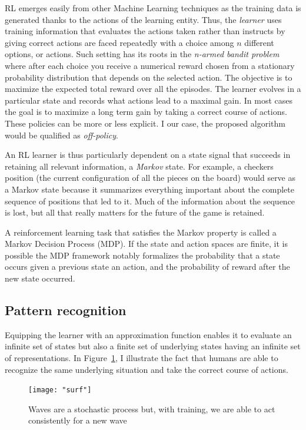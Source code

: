 \documentclass[letterpaper, 10.5 pt, conference]{ieeeconf}
\begin{document}
RL emerges easily from other Machine Learning techniques as the training data is generated thanks to the actions of the learning entity. Thus, the \textit{learner} uses training information that evaluates the actions taken rather than instructs by giving correct actions are faced repeatedly with a choice among $n$ different options, or actions. Such setting has its roots in the \textit{n-armed bandit problem} where after each choice you receive a numerical reward chosen from a stationary probability distribution that depends on the selected action. The objective is to maximize the expected total reward over all the episodes. The learner evolves in a particular state and records what actions lead to a maximal gain. In most cases the goal is to maximize a long term gain by taking a correct course of actions. These policies can be more or less explicit. I our case, the proposed algorithm would be qualified as \textit{off-policy}.

An RL learner is thus particularly dependent on a state signal that succeeds in retaining all relevant information, a \textit{Markov} state. For example, a checkers position (the current configuration of all the pieces on the board) would serve as a Markov state because it summarizes everything important about the complete sequence of positions that led to it. Much of the information about the sequence is lost, but all that really matters for the future of the game is retained. 

A reinforcement learning task that satisfies the Markov property is called a Markov Decision Process (MDP). If the state and action spaces are finite, it is possible the MDP framework notably formalizes the probability that a state occurs given a previous state an action, and the probability of reward after the new state occurred.

\subsection{Pattern recognition}

Equipping the learner with an approximation function enables it to evaluate an infinite set of states but also a finite set of underlying states having an infinite set of representations. In Figure~\ref{fig:surf}, I illustrate the fact that humans are able to recognize the same underlying situation and take the correct course of actions.

\begin{figure}
\begin{center}
\texttt{[image: "surf"]}
\caption{Waves are a stochastic process but, with training, we are able to act consistently for a new wave}
\label{fig:surf}
\end{center}
\end{figure}
\end{document}
